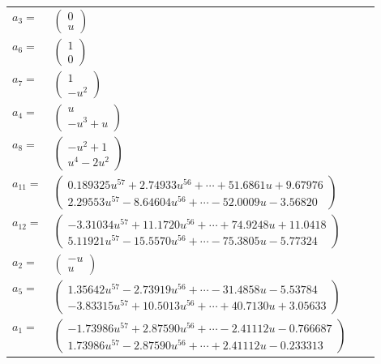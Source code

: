 \documentclass[1p]{elsarticle_modified}
\theoremstyle{definition}
\begin{document}
\begin{tabular}{m{7pt} m{180pt} m{7pt} m{180pt} }
\flushright $a_{3}=$&$\begin{pmatrix}0\\u\end{pmatrix}$ \\
\flushright $a_{6}=$&$\begin{pmatrix}1\\0\end{pmatrix}$ \\
\flushright $a_{7}=$&$\begin{pmatrix}1\\- u^2\end{pmatrix}$ \\
\flushright $a_{4}=$&$\begin{pmatrix}u\\- u^3+u\end{pmatrix}$ \\
\flushright $a_{8}=$&$\begin{pmatrix}- u^2+1\\u^4-2 u^2\end{pmatrix}$ \\
\flushright $a_{11}=$&$\begin{pmatrix}0.189325 u^{57}+2.74933 u^{56}+\cdots+51.6861 u+9.67976\\2.29553 u^{57}-8.64604 u^{56}+\cdots-52.0009 u-3.56820\end{pmatrix}$ \\
\flushright $a_{12}=$&$\begin{pmatrix}-3.31034 u^{57}+11.1720 u^{56}+\cdots+74.9248 u+11.0418\\5.11921 u^{57}-15.5570 u^{56}+\cdots-75.3805 u-5.77324\end{pmatrix}$ \\
\flushright $a_{2}=$&$\begin{pmatrix}- u\\u\end{pmatrix}$ \\
\flushright $a_{5}=$&$\begin{pmatrix}1.35642 u^{57}-2.73919 u^{56}+\cdots-31.4858 u-5.53784\\-3.83315 u^{57}+10.5013 u^{56}+\cdots+40.7130 u+3.05633\end{pmatrix}$ \\
\flushright $a_{1}=$&$\begin{pmatrix}-1.73986 u^{57}+2.87590 u^{56}+\cdots-2.41112 u-0.766687\\1.73986 u^{57}-2.87590 u^{56}+\cdots+2.41112 u-0.233313\end{pmatrix}$ \\

\end{tabular}
\end{document}

